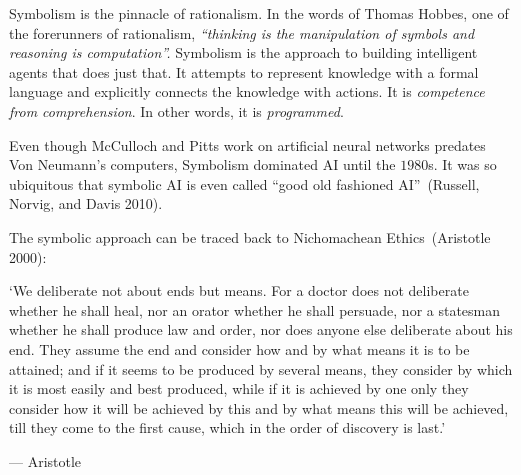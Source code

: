 \documentclass[
  letterpaper,
  12pt,
  british]{tufte-book}
\renewenvironment{quote}{
  \list{}{\leftmargin=3.5cm\topsep=0pt}
  \item\relax\small\itshape
}
{\endlist}
\theoremstyle{plain}
\theoremstyle{definition}
\theoremstyle{plain}
\theoremstyle{remark}
\begin{document}
Symbolism is the pinnacle of rationalism. In the words of Thomas Hobbes,
one of the forerunners of rationalism, \emph{``thinking is the
manipulation of symbols and reasoning is computation''.} Symbolism is
the approach to building intelligent agents that does just that. It
attempts to represent knowledge with a formal language and explicitly
connects the knowledge with actions. It is \emph{competence from
comprehension}. In other words, it is \emph{programmed}.

Even though McCulloch and Pitts work on artificial neural networks
predates Von Neumann's computers, Symbolism dominated {AI} until the
\(1980\)s. It was so ubiquitous that symbolic {AI} is even called ``good
old fashioned AI''~(Russell, Norvig, and Davis
2010).

The symbolic approach can be traced back to Nichomachean
Ethics~(Aristotle
2000):

\begin{quote}
`We deliberate not about ends but means. For a doctor does not
deliberate whether he shall heal, nor an orator whether he shall
persuade, nor a statesman whether he shall produce law and order, nor
does anyone else deliberate about his end. They assume the end and
consider how and by what means it is to be attained; and if it seems to
be produced by several means, they consider by which it is most easily
and best produced, while if it is achieved by one only they consider how
it will be achieved by this and by what means this will be achieved,
till they come to the first cause, which in the order of discovery is
last.'

--- Aristotle~
\end{quote}
\end{document}
